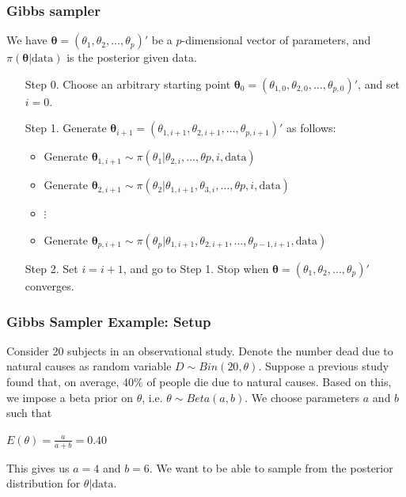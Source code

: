 \documentclass{beamer}
\begin{document}
\begin{frame}
\frametitle{Gibbs sampler}
We have $\pmb{\theta} = (\theta_1, \theta_2, \ldots, \theta_p)'$ be a $p$-dimensional vector of parameters, and $\pi(\pmb{\theta}|\text{data})$ is the posterior given data. 
\begin{enumerate}
\item[Step 0.] Choose an arbitrary starting point $\pmb{\theta}_{0} = (\theta_{1,0}, \theta_{2,0}, \ldots, \theta_{p,0})'$, and set $i = 0$.
\item [Step 1.] Generate $\pmb{\theta}_{i+1} = (\theta_{1,i+1}, \theta_{2,i+1}, \ldots, \theta_{p,i+1})'$ as follows:
	\begin{itemize}
	\item Generate $\pmb{\theta}_{1,i+1} \sim \pi(\theta_1|\theta_{2,i}, \ldots, \theta{p,i},\text{data})$
	\item Generate $\pmb{\theta}_{2,i+1} \sim \pi(\theta_2|\theta_{1,i+1}, \theta_{3,i}, \ldots, \theta{p,i},\text{data})$
	\item $\vdots$
	\item Generate $\pmb{\theta}_{p,i+1} \sim \pi(\theta_p|\theta_{1,i+1}, \theta_{2,i+1}, \ldots, \theta_{p-1,i+1}, \text{data})$
	\end{itemize}
\item [Step 2.] Set $i = i+1$, and go to Step 1.
Stop when $\pmb{\theta} = (\theta_1, \theta_2, \ldots, \theta_p)'$ converges.\footnotemark[1]
\end{enumerate}
\end{frame}

\begin{frame}
\frametitle{Gibbs Sampler Example: Setup}
Consider 20 subjects in an observational study. Denote the number dead due to natural causes as random variable $D \sim Bin(20,\theta)$.  Suppose a previous study found that, on average, $40\%$ of people die due to natural causes. Based on this, we impose a beta prior on $\theta$, i.e. $\theta \sim Beta(a,b)$. We choose parameters $a$ and $b$ such that 
\begin{center}
$E(\theta) = \frac{a}{a+b} = 0.40$
\end{center}
This gives us $a = 4$ and $b = 6$. We want to be able to sample from the posterior distribution for $\theta|\text{data}$. 
\end{frame}
\end{document}
